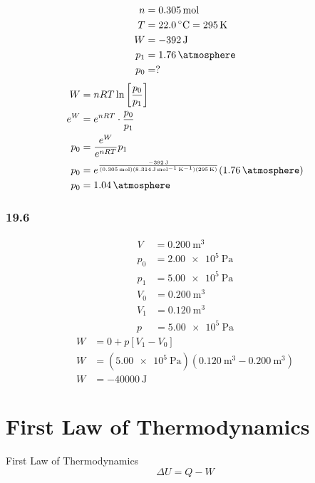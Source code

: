 \documentclass{article}
\begin{document}
\begin{align*}
	n & = \SI{0.305}{\mole} \\
	T & = \SI{22.0}{\celsius} = \SI{295}{\kelvin} \\
	W & = \SI{-392}{\joule} \\
	p_1 & = \SI{1.76}{\atmosphere} \\
	p_0 & = ?
\end{align*}
\begin{align*}
	W & = nRT \ln \left[ \frac{ p_0 }{ p_1 } \right] \\
	e^{W} & = e^{nRT} \cdot \frac{ p_0 }{ p_1 } \\
	p_0 & = \frac{ e^{W} }{ e^{nRT} }p_1 \\
	p_0 & = e^{ \frac{ \SI{-392}{\joule} }{ (\SI{0.305}{\mole})(\SI{8.314}{\joule \per \mole \per \kelvin})(\SI{295}{\kelvin}) } }(\SI{1.76}{\atmosphere}) \\
	p_0 & = \SI{1.04}{\atmosphere}
\end{align*}

\subsubsection{19.6}

\begin{align*}
	V & = \SI{0.200}{\meter \cubed} \\
	p_0 & = \SI{2.00e5}{\pascal} \\
	p_1 & = \SI{5.00e5}{\pascal}
\end{align*}
\begin{align*}
	V_0 & = \SI{0.200}{\meter \cubed} \\
	V_1 & = \SI{0.120}{\meter \cubed} \\
	p & = \SI{5.00e5}{\pascal}
\end{align*}
\begin{align*}
	W & = 0 + p \left[ V_1 - V_0 \right] \\
	W & = (\SI{5.00e5}{\pascal})(\SI{0.120}{\meter \cubed} - \SI{0.200}{\meter \cubed}) \\
	W & = \SI{-40000}{\joule}
\end{align*}

\section{First Law of Thermodynamics}

First Law of Thermodynamics
\begin{equation}
	\Delta U = Q - W
\end{equation}
\end{document}
